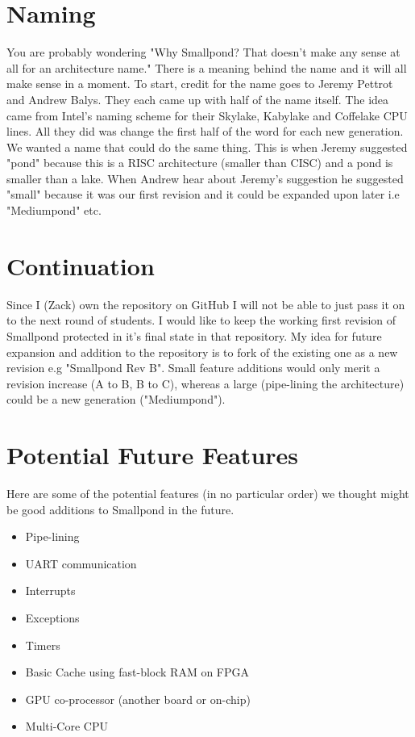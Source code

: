 \documentclass[12pt]{article}
\begin{document}
\section{Naming}
You are probably wondering "Why Smallpond? That doesn't make any sense at all for an architecture name." There is a meaning behind the name and it will all make sense in a moment. To start, credit for the name goes to Jeremy Pettrot and Andrew Balys. They each came up with half of the name itself. The idea came from Intel's naming scheme for their Skylake, Kabylake and Coffelake CPU lines. All they did was change the first half of the word for each new generation. We wanted a name that could do the same thing. This is when Jeremy suggested "pond" because this is a RISC architecture (smaller than CISC) and a pond is smaller than a lake. When Andrew hear about Jeremy's suggestion he suggested "small" because it was our first revision and it could be expanded upon later i.e "Mediumpond" etc.
\newpage

\section{Continuation}
Since I (Zack) own the repository on GitHub I will not be able to just pass it on to the next round of students. I would like to keep the working first revision of Smallpond protected in it's final state in that repository. My idea for future expansion and addition to the repository is to fork of the existing one as a new revision e.g "Smallpond Rev B". Small feature additions would only merit a revision increase (A to B, B to C), whereas a large (pipe-lining the architecture) could be a new generation ("Mediumpond").

    \section{Potential Future Features}
    Here are some of the potential features (in no particular order) we thought might be good additions to Smallpond in the future.\\
    \begin{itemize}
        \item Pipe-lining
        \item UART communication
        \item Interrupts
        \item Exceptions
        \item Timers
        \item Basic Cache using fast-block RAM on FPGA
        \item GPU co-processor (another board or on-chip)
        \item Multi-Core CPU
    \end{itemize}
    
\end{document}
